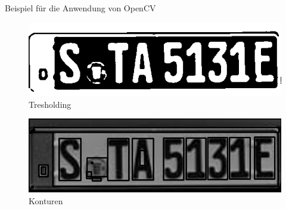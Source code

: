 \begin{frame}{Beispiel für die Anwendung von OpenCV}

\begin{figure}
\begin{center}
\includegraphics[scale=0.25]{bilder/Nummer_3_treshold.png}
\caption{Tresholding}
\label{Tresholding}
\end{center}
\end{figure}

\begin{figure}
\begin{center}
\includegraphics[scale=0.25]{bilder/Nummer_4_Konturen.png}
\caption{Konturen}
\label{Konturen}
\end{center}
\end{figure}

\end{frame}

